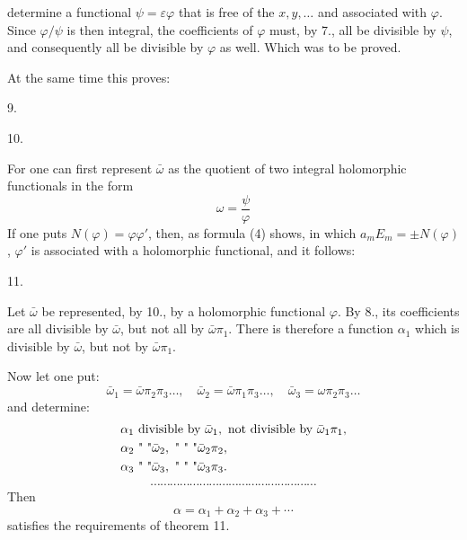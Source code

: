 determine a functional $\psi = \varepsilon\varphi$ that is free of the $x, y, \ldots$ and
associated with $\varphi$. Since $\varphi/\psi$ is then integral, the coefficients of
$\varphi$ must, by 7., all be divisible by $\psi$, and consequently all be divisible
by $\varphi$ as well. Which was to be proved.

At the same time this proves:

9. 

10. 

For one can first represent $\bar\omega$ as the quotient of two integral
holomorphic functionals in the form
\[
\omega = \frac{\psi}{\varphi}
\]
If one puts $N(\varphi) = \varphi\varphi'$, then, as formula (4)
shows, in which $a_m E_m = \pm N(\varphi)$, $\varphi'$ is associated with a
holomorphic functional, and it follows:

11. 

Let $\bar\omega$ be represented, by 10., by a holomorphic functional $\varphi$.
By 8., its coefficients are all divisible by $\bar\omega$, but not
all by $\bar\omega \pi_1$. There is therefore a function $\alpha_1$ which is divisible
by $\bar\omega$, but not by $\bar\omega \pi_1$.

Now let one put:
\[
\bar\omega_1 = \bar\omega \pi_2 \pi_3 \ldots, \quad \bar\omega_2 = \bar\omega \pi_1 \pi_3 \ldots, \quad \bar\omega_3 = \omega \pi_2 \pi_3 \ldots
\]
and determine:
\[
\begin{aligned}
&\alpha_1 \text{ divisible by } \bar\omega_1, \text{ not divisible by } \bar\omega_1 \pi_1, \\
&\alpha_2 \text{ \textquotedbl} \text{ \textquotedbl} \bar\omega_2, \text{ \textquotedbl} \text{ \textquotedbl} \text{ \textquotedbl} \bar\omega_2 \pi_2, \\
&\alpha_3 \text{ \textquotedbl} \text{ \textquotedbl} \bar\omega_3, \text{ \textquotedbl} \text{ \textquotedbl} \text{ \textquotedbl} \bar\omega_3 \pi_3.
\end{aligned}
\]
\[
\cdots\cdots\cdots\cdots\cdots\cdots\cdots\cdots\cdots\cdots\cdots\cdots\cdots\cdots\cdots\cdots\cdots
\]
Then
\[
\alpha = \alpha_1 + \alpha_2 + \alpha_3 + \cdots
\]
satisfies the requirements of theorem 11.
